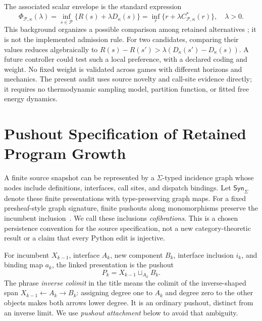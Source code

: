 \documentclass[11pt]{article}
\theoremstyle{definition}
\theoremstyle{remark}
\newcommand{\Syn}{\mathsf{Syn}_{\Sigma}}
\begin{document}
The associated scalar envelope is the standard expression
\begin{equation}
 \Phi_{\mathcal P,\kappa}(\lambda)
 =\inf_{s\in\mathcal P}\{R(s)+\lambda D_\kappa(s)\}
 =\inf_r\{r+\lambda C^*_{\mathcal P,\kappa}(r)\},\quad\lambda>0.
 \label{eq:model-dual}
\end{equation}
This background organizes a possible comparison among retained alternatives
\cite{losscomplexity,grunwald2007mdl}; it is not the implemented admission rule.
For two candidates, comparing their values reduces algebraically to
$R(s)-R(s')>\lambda(D_\kappa(s')-D_\kappa(s))$. A future controller could test
such a local preference, with a declared coding and weight. No fixed weight is
validated across games with different horizons and mechanics. The present audit
uses source novelty and call-site evidence directly; it requires no thermodynamic
sampling model, partition function, or fitted free energy dynamics.

\section{Pushout Specification of Retained Program Growth}
\label{sec:category}
A finite source snapshot can be represented by a $\Sigma$-typed incidence graph
whose nodes include definitions, interfaces, call sites, and dispatch bindings.
Let $\Syn$ denote these finite presentations with type-preserving graph maps.
For a fixed presheaf-style graph signature, finite pushouts along monomorphisms
preserve the incumbent inclusion~\cite{lack2005adhesive,riehl2016category}.
We call these inclusions \emph{cofibrations}. This is a chosen persistence
convention for the source specification, not a new category-theoretic result or a
claim that every Python edit is injective.

For incumbent $X_{k-1}$, interface $A_k$, new component $B_k$, interface inclusion
$i_k$, and binding map $a_k$, the linked presentation is the pushout
\begin{equation}
 P_k=X_{k-1}\sqcup_{A_k}B_k.
 \label{eq:inverse-colimit-attachment}
\end{equation}
The phrase \emph{inverse colimit} in the title means the colimit of the
inverse-shaped span $X_{k-1}\leftarrow A_k\rightarrow B_k$: assigning degree one
to $A_k$ and degree zero to the other objects makes both arrows lower degree.
It is an ordinary pushout, distinct from an inverse limit. We use \emph{pushout
attachment} below to avoid that ambiguity.
\end{document}
